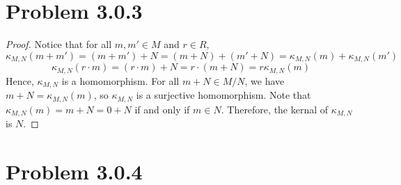 \documentclass[12pt]{article}
\begin{document}
\newpage 

\section{Problem 3.0.3}

\begin{proof}
	Notice that for all $m, m' \in M$ and $r\in R$, 
    $$\kappa_{M, N}(m+m') = (m+m') + N = (m+N) + (m'+N) = \kappa_{M, N}(m) + \kappa_{M, N}(m')$$
    $$\kappa_{M, N}(r\cdot m) = (r\cdot m) + N = r\cdot (m+N) = r\kappa_{M, N}(m)$$
    Hence, $\kappa_{M, N}$ is a homomorphism. For all $m+N \in M/N$, we have $m + N = \kappa_{M, N}(m)$, so $\kappa_{M, N}$ is a surjective homomorphism. Note that $\kappa_{M, N}(m) = m+N = 0+N$ if and only if $m \in N$. Therefore, the kernal of $\kappa_{M, N}$ is $N$.
\end{proof}

\newpage 

\section{Problem 3.0.4}
\end{document}
